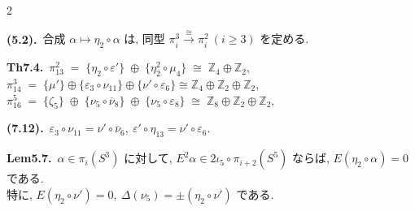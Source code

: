 \documentclass[10pt, leqno]{ltjsarticle}
\newcommand{\ov}[1]{\overline{#1}}
\newcommand{\gen}[1]{\{#1\}}       %
\newcommand{\pit}[2]{\pi_{#1}^{#2}}
\numberwithin{equation}{section}
\theoremstyle{plain}
\theoremstyle{definition}
\theoremstyle{remark}
\begin{document}
\begin{paracol}{2}
\switchcolumn

\noindent
\textbf{(5.2).}\
\(\text{合成 } \alpha\longmapsto \eta_2\circ \alpha \text{ は, 同型 } 
\pi^{3}_{i}\xrightarrow{\cong}\pi^{2}_{i}\ (i\ge3) 
\text{ を定める. }\)

\noindent
\textbf{Th7.4.}\
\(\pit{13}{2} \;=\; \gen{\eta_{2}\circ \varepsilon'} \;\oplus\; \gen{\eta_{2}^{2}\circ \mu_{4}}
  \;\cong\; \mathbb Z_{4}\oplus\mathbb Z_{2},\)\\
\(\pit{14}{3} \;=\; \gen{\mu'} \oplus \gen{\varepsilon_3\circ\nu_{11}} \oplus \gen{\nu'\circ\varepsilon_6}
  \cong \mathbb{Z}_4 \oplus \mathbb{Z}_2 \oplus \mathbb{Z}_2,\)\\
\(\pit{16}{5} \;=\; \gen{\zeta_{5}} \;\oplus\; \gen{\nu_{5}\circ \overline{\nu}_{8}}
  \;\oplus\; \gen{\nu_{5}\circ \varepsilon_{8}}
  \;\cong\; \mathbb Z_{8}\oplus\mathbb Z_{2}\oplus\mathbb Z_{2},\)

\noindent
\textbf{(7.12).}\
\(\varepsilon_3\circ\nu_{11} = \nu'\circ\ov{\nu}_6,\
\varepsilon'\circ\eta_{13} = \nu'\circ\varepsilon_6 .\)

\noindent
\textbf{Lem5.7.}\
\(\alpha\in\pi_i(S^3)\) に対して,
\(E^2\alpha\in2\iota_5\circ\pi_{i+2}(S^5)\) ならば, 
\(E(\eta_2\circ\alpha)=0\) である. \\
特に, \(E(\eta_2\circ\nu')=0, \ \Delta(\nu_5)=\pm(\eta_2\circ\nu')\) である. 


\end{paracol}
\end{document}
